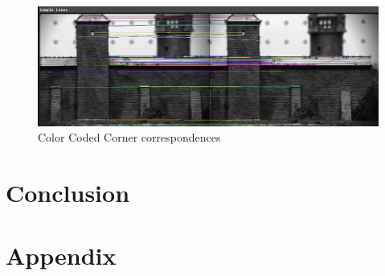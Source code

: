 \documentclass[letterpaper,11pt]{article}
\begin{document}
\begin{figure}[h]
  \centering
  \includegraphics[width=\linewidth]{images/correspondences.png}
  \caption{Color Coded Corner correspondences}
  \label{fig:sfig1}
\end{figure}



\section{Conclusion}


\section{Appendix}
\end{document}
